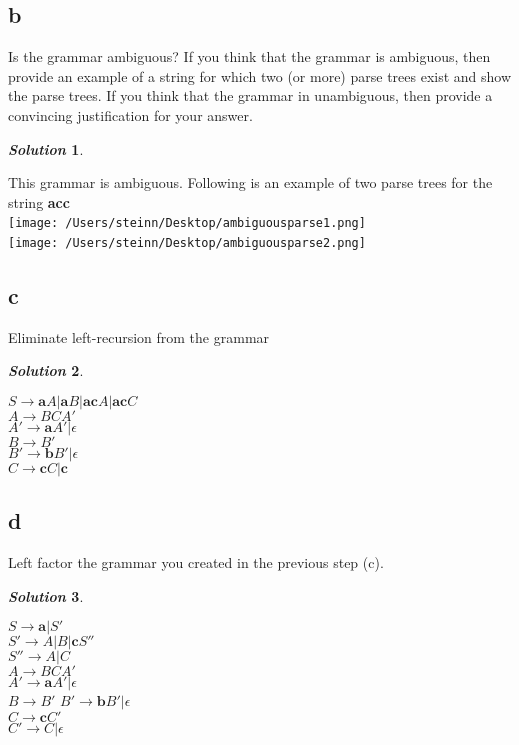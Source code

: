 \documentclass[11pt, a4paper]{article}
\newtheorem*{solution}{\emph{Solution}}
\begin{document}
	\subsection*{b}
		Is the grammar ambiguous? If you think that the grammar is ambiguous, then provide an example of a string for which two (or more) parse trees exist and show the parse trees. If you think that the grammar in unambiguous, then provide a convincing justification for your answer.
	\begin{solution}
	\end{solution}
		This grammar is ambiguous. Following is an example of two parse trees for the string \textbf{acc}\\
		\texttt{[image: /Users/steinn/Desktop/ambiguousparse1.png]}~\\
		\texttt{[image: /Users/steinn/Desktop/ambiguousparse2.png]}~\\

	\subsection*{c}
		Eliminate left-recursion from the grammar
		\begin{solution}
		\end{solution}
		$S \rightarrow \textbf{a}A | \textbf{a}B | \textbf{ac}A | \textbf{ac}C$\\
		$A \rightarrow BCA'$\\
		$A' \rightarrow \textbf{a}A' | \epsilon$\\
		$B \rightarrow B'$\\
		$B' \rightarrow \textbf{b}B' | \epsilon$\\
		$C \rightarrow \textbf{c}C | \textbf{c}$

	\subsection*{d}
		Left factor the grammar you created in the previous step (c).\\
		\begin{solution} \end{solution}
		$S \rightarrow \textbf{a} | S'$\\
		$S' \rightarrow A | B | \textbf{c}S''$\\
		$S'' \rightarrow A | C$\\
		$A \rightarrow BCA'$\\
		$A' \rightarrow \textbf{a}A' | \epsilon$\\
		$B \rightarrow B'$
		$B' \rightarrow \textbf{b}B' | \epsilon$\\
		$C \rightarrow \textbf{c}C'$\\
		$C' \rightarrow C | \epsilon$
\end{document}
